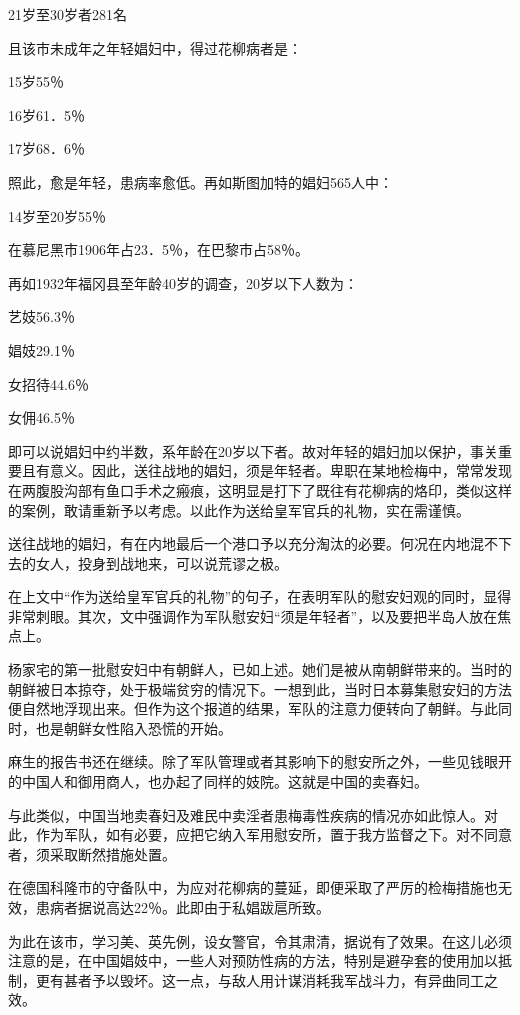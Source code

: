 \documentclass[12pt,UTF8]{ctexbook}
\begin{document}
21岁至30岁者281名

且该市未成年之年轻娼妇中，得过花柳病者是：

15岁55％

16岁61．5％

17岁68．6％

照此，愈是年轻，患病率愈低。再如斯图加特的娼妇565人中：

14岁至20岁55％

在慕尼黑市1906年占23．5％，在巴黎市占58％。

再如1932年福冈县至年龄40岁的调查，20岁以下人数为：

艺妓56.3％

娼妓29.1％

女招待44.6％

女佣46.5％

即可以说娼妇中约半数，系年龄在20岁以下者。故对年轻的娼妇加以保护，事关重要且有意义。因此，送往战地的娼妇，须是年轻者。卑职在某地检梅中，常常发现在两腹股沟部有鱼口手术之瘢痕，这明显是打下了既往有花柳病的烙印，类似这样的案例，敢请重新予以考虑。以此作为送给皇军官兵的礼物，实在需谨慎。

送往战地的娼妇，有在内地最后一个港口予以充分淘汰的必要。何况在内地混不下去的女人，投身到战地来，可以说荒谬之极。

在上文中“作为送给皇军官兵的礼物”的句子，在表明军队的慰安妇观的同时，显得非常刺眼。其次，文中强调作为军队慰安妇“须是年轻者”，以及要把半岛人放在焦点上。

杨家宅的第一批慰安妇中有朝鲜人，已如上述。她们是被从南朝鲜带来的。当时的朝鲜被日本掠夺，处于极端贫穷的情况下。一想到此，当时日本募集慰安妇的方法便自然地浮现出来。但作为这个报道的结果，军队的注意力便转向了朝鲜。与此同时，也是朝鲜女性陷入恐慌的开始。

麻生的报告书还在继续。除了军队管理或者其影响下的慰安所之外，一些见钱眼开的中国人和御用商人，也办起了同样的妓院。这就是中国的卖春妇。

与此类似，中国当地卖春妇及难民中卖淫者患梅毒性疾病的情况亦如此惊人。对此，作为军队，如有必要，应把它纳入军用慰安所，置于我方监督之下。对不同意者，须采取断然措施处置。

在德国科隆市的守备队中，为应对花柳病的蔓延，即便采取了严厉的检梅措施也无效，患病者据说高达22％。此即由于私娼跋扈所致。

为此在该市，学习美、英先例，设女警官，令其肃清，据说有了效果。在这儿必须注意的是，在中国娼妓中，一些人对预防性病的方法，特别是避孕套的使用加以抵制，更有甚者予以毁坏。这一点，与敌人用计谋消耗我军战斗力，有异曲同工之效。
\end{document}
